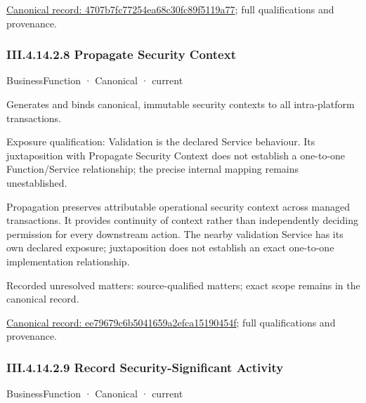 {\footnotesize \href{../../../../../../../../continuum/business/business-function/4707b7fc77254ea68c30fc89f5119a77.md}{Canonical record: 4707b7fc77254ea68c30fc89f5119a77}; full qualifications and provenance.}\par
\subsubsection*{III.4.14.2.8 Propagate Security Context}
\label{navigation:III.4.14.2.8}

\label{element:ee79679c6b5041659a2efca15190454f}
{\small BusinessFunction · Canonical · current}\par

Generates and binds canonical, immutable security contexts to all intra-platform transactions.



Exposure qualification: Validation is the declared Service behaviour. Its juxtaposition with Propagate Security Context does not establish a one-to-one Function/Service relationship; the precise internal mapping remains unestablished.



Propagation preserves attributable operational security context across managed transactions. It provides continuity of context rather than independently deciding permission for every downstream action. The nearby validation Service has its own declared exposure; juxtaposition does not establish an exact one-to-one implementation relationship.


{\small Recorded unresolved matters: source-qualified matters; exact scope remains in the canonical record.}\par
{\footnotesize \href{../../../../../../../../continuum/business/business-function/ee79679c6b5041659a2efca15190454f.md}{Canonical record: ee79679c6b5041659a2efca15190454f}; full qualifications and provenance.}\par
\subsubsection*{III.4.14.2.9 Record Security-Significant Activity}
\label{navigation:III.4.14.2.9}

\label{element:6177ed0d53e5407ab1bc4b721619ed44}
{\small BusinessFunction · Canonical · current}\par

